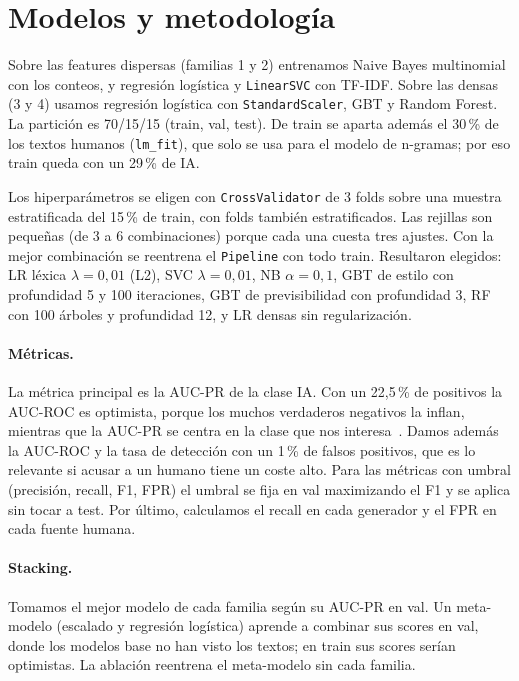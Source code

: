 \documentclass[runningheads]{llncs}
\begin{document}
\section{Modelos y metodología}

Sobre las features dispersas (familias 1 y 2) entrenamos Naive Bayes multinomial con los
conteos, y regresión logística y \texttt{LinearSVC} con TF-IDF. Sobre las densas (3 y 4)
usamos regresión logística con \texttt{StandardScaler}, GBT y Random Forest. La partición es 70/15/15 (train, val, test). De train se aparta además el 30\,\% de los textos
humanos (\texttt{lm\_fit}), que solo se usa para el modelo de n-gramas; por eso train queda con
un 29\,\% de IA.

Los hiperparámetros se eligen con \texttt{CrossValidator} de 3 folds sobre una muestra
estratificada del 15\,\% de train, con folds también estratificados. Las rejillas son pequeñas
(de 3 a 6 combinaciones) porque cada una cuesta tres ajustes. Con la mejor combinación se
reentrena el \texttt{Pipeline} con todo train. Resultaron elegidos: LR léxica $\lambda=0{,}01$
(L2), SVC $\lambda=0{,}01$, NB $\alpha=0{,}1$, GBT de estilo con profundidad 5 y 100
iteraciones, GBT de previsibilidad con profundidad 3, RF con 100 árboles y profundidad 12, y LR
densas sin regularización.

\paragraph{Métricas.} La métrica principal es la AUC-PR de la clase IA. Con un 22,5\,\% de
positivos la AUC-ROC es optimista, porque los muchos verdaderos negativos la inflan, mientras
que la AUC-PR se centra en la clase que nos interesa~\cite{saito2015prplot}. Damos además la AUC-ROC y la tasa de
detección con un 1\,\% de falsos positivos, que es lo relevante si acusar a un humano tiene
un coste alto. Para las métricas con umbral (precisión, recall, F1, FPR) el umbral se fija en
val maximizando el F1 y se aplica sin tocar a test. Por último, calculamos el recall en cada
generador y el FPR en cada fuente humana.

\paragraph{Stacking.} Tomamos el mejor modelo de cada familia según su AUC-PR en
val. Un meta-modelo (escalado y regresión logística) aprende a
combinar sus scores en val, donde los modelos base no han visto los textos; en train sus
scores serían optimistas. La ablación reentrena el meta-modelo sin cada familia.
\end{document}
